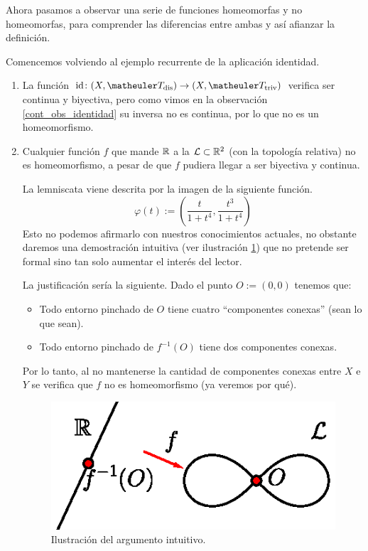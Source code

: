 Ahora pasamos a observar una serie de funciones homeomorfas y no homeomorfas, para comprender las diferencias entre ambas y así afianzar la definición.
\label{etop_exa_homeomorfismos}
\begin{exa}[Homeomorfismos] Comencemos volviendo al ejemplo recurrente de la aplicación identidad.
	\begin{enumerate}
		\item La función $\text{id}\colon(X,\T_{\text{dis}})\rightarrow(X,\T_\text{triv})$ verifica ser continua y biyectiva, pero como vimos en la observación \ref{cont_obs_identidad} su inversa no es continua, por lo que no es un homeomorfismo. 
		
		\item Cualquier función $f$ que mande $\mathbb{R}$ a la  $\mathcal{L}\subset\mathbb{R}^2$ (con la topología relativa) no es homeomorfismo, a pesar de que $f$ pudiera llegar a ser biyectiva y continua.
		
		La lemniscata viene descrita por la imagen de la siguiente función.
		\[\varphi(t):=\left(\frac{t}{1+t^4},\frac{t^3}{1+t^4}\right)\]
		Esto no podemos afirmarlo con nuestros conocimientos actuales, no obstante daremos una demostración intuitiva (ver ilustración \ref{cont_img_lemins}) que no pretende ser formal sino tan solo aumentar el interés del lector.
		
		La justificación sería la siguiente. Dado el punto $O:=(0,0)$ tenemos que:
		\begin{itemize}
			\item Todo entorno pinchado de $O$ tiene cuatro ``componentes conexas'' (sean lo que sean).
			\item Todo entorno pinchado de $f^{-1}(O)$ tiene dos componentes conexas.
		\end{itemize}
		
		Por lo tanto, al no mantenerse la cantidad de componentes conexas entre $X$ e $Y$ se verifica que $f$ no es homeomorfismo (ya veremos por qué).
		\begin{figure}[h!]
			\centering
			\includegraphics[scale = 0.75]{img/lemniscata}
			\caption{Ilustración del argumento intuitivo.}
			\label{cont_img_lemins}
		\end{figure}
		

\end{enumerate}
\end{exa}
